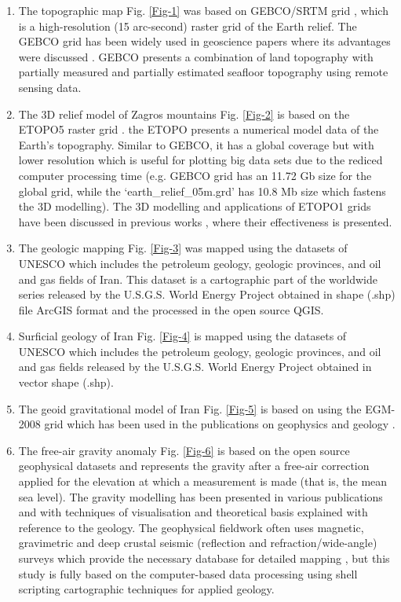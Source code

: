 \documentclass[12pt,a4paper,oneside]{article}
\begin{document}
\begin{enumerate}  
	\item The topographic map Fig. \ref{Fig-1} was based on GEBCO/SRTM grid \cite{GEBCO}, which is a high-resolution (15 arc-second) raster grid of the Earth relief. The GEBCO grid has been widely used in geoscience papers where its advantages were discussed \cite{Lemenkova2020c,Lemenkova2020d}. GEBCO presents a combination of land topography with partially measured and partially estimated seafloor topography using remote sensing data. 
	\item The 3D relief model of Zagros mountains Fig. \ref{Fig-2} is based on the ETOPO5 raster grid \cite{AmanteEakins}. the ETOPO presents a numerical model data of the Earth’s topography. Similar to GEBCO, it has a global coverage but with lower resolution which is useful for plotting big data sets due to the rediced computer processing time (e.g. GEBCO grid has an 11.72 Gb size for the global grid, while the ‘earth\_relief\_05m.grd’ has 10.8 Mb size which fastens the 3D modelling). The 3D modelling and applications of ETOPO1 grids have been discussed in previous works \citep{Lemenkova2020e,Verard,Lemenkova2020f,Spooner,Lemenkova2020g}, where their effectiveness is presented. 
	\item The geologic mapping Fig. \ref{Fig-3} was mapped using the datasets of UNESCO which includes the petroleum geology, geologic provinces, and oil and gas fields of Iran. This dataset is a cartographic part of the worldwide series released by the U.S.G.S. World Energy Project obtained in shape (.shp) file ArcGIS format and the processed in the open source QGIS.
	\item Surficial geology of Iran Fig. \ref{Fig-4} is mapped using the datasets of UNESCO which includes the petroleum geology, geologic provinces, and oil and gas fields released by the U.S.G.S. World Energy Project obtained in vector shape (.shp).
	\item The geoid gravitational model of Iran Fig. \ref{Fig-5} is based on using the EGM-2008 grid \cite{Pavlis} which has been used in the publications on geophysics and geology \cite{Lemenkova2020h}.
	\item The free-air gravity anomaly Fig. \ref{Fig-6} is based on the open source geophysical datasets \cite{Sandwell1997,Sandwell2014} and represents the gravity after a free-air correction applied for the elevation at which a measurement is made (that is, the mean sea level). The gravity modelling has been presented in various publications \cite{Lemenkova2020i} and \cite{Djamour} with techniques of visualisation and theoretical basis explained with reference to the geology. The geophysical fieldwork often uses magnetic, gravimetric and deep crustal seismic (reflection and refraction/wide-angle) surveys which provide the necessary database for detailed mapping \cite{Gohl2006a,Gohl2006b,Kuhn}, but this study is fully based on the computer-based data processing using shell scripting cartographic techniques for applied geology.

\end{enumerate}
\end{document}
